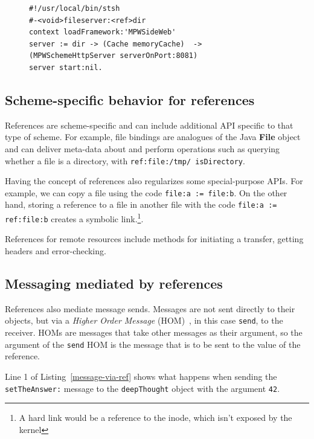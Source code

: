\documentclass[preprint]{sigplanconf}
\begin{document}
\vspace{-1.0em}
\begin{figure}[htbp]
\begin{lstlisting}[style=numbers,label=fileserver,caption=Exporting a directory via http.]
#!/usr/local/bin/stsh
#-<void>fileserver:<ref>dir
context loadFramework:'MPWSideWeb'
server := dir -> (Cache memoryCache)  ->  (MPWSchemeHttpServer serverOnPort:8081)
server start:nil.
\end{lstlisting}
\end{figure}

\vspace{-2.0em}


\subsection{Scheme-specific behavior for references}

References are scheme-specific and can include additional API specific to that type of scheme.
For example, file bindings are analogues of the Java {\bf File} object and can deliver
meta-data about and perform operations such as querying whether a file is a directory, with
{\tt ref:file:/tmp/ isDirectory}.


Having the concept of references also regularizes some special-purpose APIs.  For example,
we can copy a file using the code {\tt file:a := file:b}.  On the other hand, storing a reference 
to a file in another file with the code {\tt file:a := ref:file:b} creates a symbolic link.\footnote{A hard link
would be a reference to the inode, which isn't exposed by the kernel}.

References for remote resources include methods for initiating a transfer, getting headers and 
error-checking.

\subsection{Messaging mediated by references}

References also mediate message sends.   Messages are not sent directly to their objects, but via a
\emph{Higher Order Message} (HOM)~\cite{HOM}, in this case {\tt send}, to the receiver.    HOMs
are messages that take other messages as their argument, so the argument of the {\tt send} HOM is the
message that is to be sent to the value of the reference.  

  Line 1 of Listing~\ref{message-via-ref} shows
what happens when sending the {\tt setTheAnswer:} message to the {\tt deepThought} object with
the argument {\tt 42}.
\end{document}
